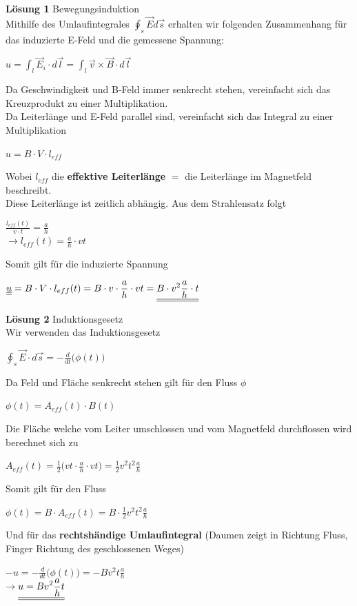 \beginbsp


\textbf{Lösung 1} Bewegungsinduktion \\
Mithilfe des Umlaufintegrales $\displaystyle \oint_s \vec{E} d\vec{s}$ erhalten wir folgenden Zusammenhang für das induzierte E-Feld und die gemessene Spannung:
\begin{center}
	$ \displaystyle u = \int_l \vec{E}_i \cdot d\vec{l} = \int_l \vec{v} \times \vec{B} \cdot d \vec{l}$
\end{center}
Da Geschwindigkeit und B-Feld immer senkrecht stehen, vereinfacht sich das Kreuzprodukt zu einer Multiplikation. \\
Da Leiterlänge und E-Feld parallel sind, vereinfacht sich das Integral zu einer Multiplikation
\begin{center}
	$\displaystyle u = B \cdot V \cdot l_{eff}$
\end{center}
Wobei $l_{eff}$ die \textbf{effektive Leiterlänge} $=$ die Leiterlänge im Magnetfeld beschreibt. \\
Diese Leiterlänge ist zeitlich abhängig. Aus dem Strahlensatz folgt
\begin{center}
	$\frac{l_{eff}(t)}{v \cdot t} = \frac{a}{h}$ \\
	$\rightarrow l_{eff} (t) =  \frac{a}{h} \cdot vt$
\end{center}
Somit gilt für die induzierte Spannung
\begin{center}

	$\displaystyle  \underline{\underline{ u}} = B \cdot V \cdot l_{eff}(t) = B \cdot v \cdot  \frac{a}{h} \cdot vt =  \underline{\underline{ B \cdot v^2 \frac{a}{h} \cdot t}}$
\end{center}

\textbf{Lösung 2} Induktionsgesetz \\
Wir verwenden das Induktionsgesetz
\begin{center}
	$\displaystyle \oint_s \vec{E} \cdot d\vec{s} = - \frac{d}{dt} \big( \phi (t)\big)$
\end{center}
Da Feld und Fläche senkrecht stehen gilt für den Fluss $\phi$
\begin{center}
	$\phi(t) = A_{eff}(t) \cdot B(t)$
\end{center}
Die Fläche welche vom Leiter umschlossen und vom Magnetfeld durchflossen wird berechnet sich zu
\begin{center}
	$A_{eff} (t) = \frac{1}{2} \big ( vt \cdot \frac{a}{h} \cdot vt \big) = \frac{1}{2} v^2t^2 \frac{a}{h}$
\end{center}
Somit gilt für den Fluss
\begin{center}
	$ \phi(t) =  B \cdot A_{eff}(t) = B \cdot \frac{1}{2} v^2t^2 \frac{a}{h}$
\end{center}
Und für das \textbf{rechtshändige Umlaufintegral} (Daumen zeigt in Richtung Fluss, Finger Richtung des geschlossenen Weges)
\begin{center}
	$ -u = - \frac{d}{dt} \big( \phi(t) \big) = - B v^2 t \frac{a}{h}$ \\
	$ \displaystyle \rightarrow \underline{\underline{ u = B v^2  \frac{a}{h} t }}$
\end{center}
\iend

